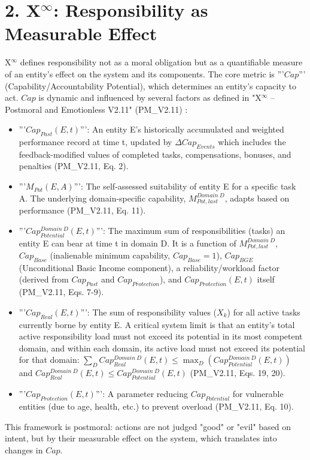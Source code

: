 \documentclass[11pt]{article}
\begin{document}
\section*{2. X$^\infty$: Responsibility as Measurable Effect}
X$^\infty$ defines responsibility not as a moral obligation but as a quantifiable measure of an entity's effect on the system and its components. The core metric is '''$Cap$''' (Capability/Accountability Potential), which determines an entity's capacity to act. $Cap$ is dynamic and influenced by several factors as defined in "X$^\infty$ -- Postmoral and Emotionless V2.11" (PM\_V2.11) \cite{XInfinityPM}:
\begin{itemize}
    \item '''$Cap_{Past}(E,t)$''': An entity E's historically accumulated and weighted performance record at time t, updated by $\Delta Cap_{Events}$ which includes the feedback-modified values of completed tasks, compensations, bonuses, and penalties (PM\_V2.11, Eq. 2).
    \item '''$M_{Pot}(E,A)$''': The self-assessed suitability of entity E for a specific task A. The underlying domain-specific capability, $M_{Pot,last}^{Domain~D}$, adapts based on performance (PM\_V2.11, Eq. 11).
    \item '''$Cap_{Potential}^{Domain~D}(E,t)$''': The maximum sum of responsibilities (tasks) an entity E can bear at time t in domain D. It is a function of $M_{Pot,last}^{Domain~D}$, $Cap_{Base}$ (inalienable minimum capability, $Cap_{Base}=1$), $Cap_{BGE}$ (Unconditional Basic Income component), a reliability/workload factor (derived from $Cap_{Past}$ and $Cap_{Protection}$), and $Cap_{Protection}(E,t)$ itself (PM\_V2.11, Eqs. 7-9).
    \item '''$Cap_{Real}(E,t)$''': The sum of responsibility values ($X_k$) for all active tasks currently borne by entity E. A critical system limit is that an entity's total active responsibility load must not exceed its potential in its most competent domain, and within each domain, its active load must not exceed its potential for that domain: $\sum_{D}Cap_{Real}^{Domain~D}(E,t) \le \max_{D}(Cap_{Potential}^{Domain~D}(E,t))$ and $Cap_{Real}^{Domain~D}(E,t) \le Cap_{Potential}^{Domain~D}(E,t)$ (PM\_V2.11, Eqs. 19, 20).
    \item '''$Cap_{Protection}(E,t)$''': A parameter reducing $Cap_{Potential}$ for vulnerable entities (due to age, health, etc.) to prevent overload (PM\_V2.11, Eq. 10).
\end{itemize}
This framework is postmoral: actions are not judged "good" or "evil" based on intent, but by their measurable effect on the system, which translates into changes in $Cap$.
\end{document}
